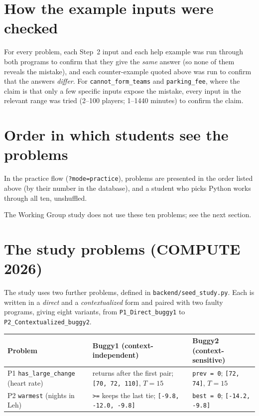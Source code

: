 \documentclass[11pt,a4paper]{article}
\begin{document}
\section{How the example inputs were checked}

For every problem, each Step~2 input and each help example was run
through both programs to confirm that they give the \emph{same} answer
(so none of them reveals the mistake), and each counter-example quoted
above was run to confirm that the answers \emph{differ}. For
\texttt{cannot\_form\_teams} and \texttt{parking\_fee}, where the claim is
that only a few specific inputs expose the mistake, every input in the
relevant range was tried (2--100 players; 1--1440 minutes) to confirm the
claim.

\section{Order in which students see the problems}

In the practice flow (\texttt{?mode=practice}), problems are presented in
the order listed above (by their number in the database), and a student
who picks Python works through all ten, unshuffled.

The Working Group study does not use these ten problems; see the next
section.

\section{The study problems (COMPUTE 2026)}

The study uses two further problems, defined in
\texttt{backend/seed\_study.py}. Each is written in a \emph{direct} and a
\emph{contextualized} form and paired with two faulty programs, giving
eight variants, from \texttt{P1\_Direct\_buggy1} to
\texttt{P2\_Contextualized\_buggy2}.

\medskip
\noindent
\begin{tabularx}{\textwidth}{@{}l L L@{}}
\toprule
\textbf{Problem} & \textbf{Buggy1 (context-independent)} & \textbf{Buggy2 (context-sensitive)} \\
\midrule
P1 \texttt{has\_large\_change} (heart rate) & returns after the first pair;
  \texttt{[70, 72, 110]}, $T=15$ & \texttt{prev = 0};
  \texttt{[72, 74]}, $T=15$ \\
P2 \texttt{warmest} (nights in Leh) & \texttt{>=} keeps the last tie;
  \texttt{[-9.8, -12.0, -9.8]} & \texttt{best = 0};
  \texttt{[-14.2, -9.8]} \\
\bottomrule
\end{tabularx}
\end{document}
